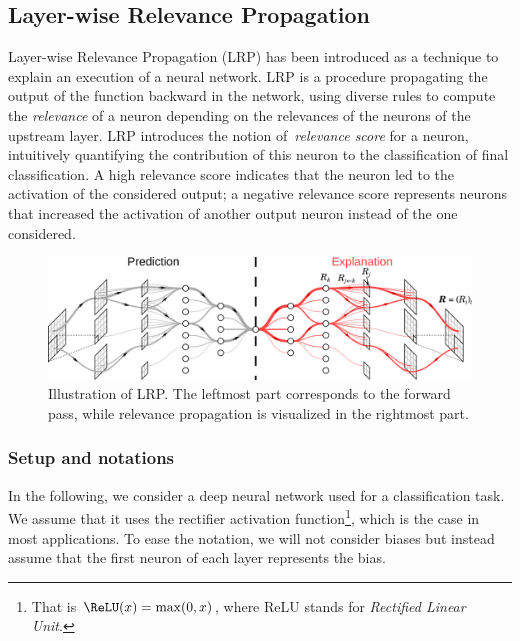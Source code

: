 \documentclass{../cs-classes/cs-classes}
\newcommand*{\1}{\digitsbb{1}}
\newcommand*{\0}{\digitsbb{0}}
\begin{document}
\subsection{Layer-wise Relevance Propagation}
Layer-wise Relevance Propagation (LRP) \cite{bach-2015} has been introduced as a technique to explain an execution of a neural network. LRP is a procedure propagating the output of the function backward in the network, using diverse rules to compute the \emph{relevance} of a neuron depending on the relevances of the neurons of the upstream layer. LRP introduces the notion of \emph{relevance score} for a neuron, intuitively quantifying the contribution of this neuron to the classification of final classification. A high relevance score indicates that the neuron led to the activation of the considered output; a negative relevance score represents neurons that increased the activation of another output neuron instead of the one considered.

\begin{figure}[H]
    \centering
    \includegraphics[width=.8\textwidth]{LRP.png}
    \caption{Illustration of LRP. The leftmost part corresponds to the forward pass, while relevance propagation is visualized in the rightmost part.\protect\footnotemark}
\end{figure}

\subsubsection{Setup and notations}
In the following, we consider a deep neural network used for a classification task. We assume that it uses the rectifier activation function\footnote{That is $\ReLU(x)=\max(0, x)$, where ReLU stands for \emph{Rectified Linear Unit}.}, which is the case in most applications. To ease the notation, we will not consider biases but instead assume that the first neuron of each layer represents the bias. 
\end{document}
